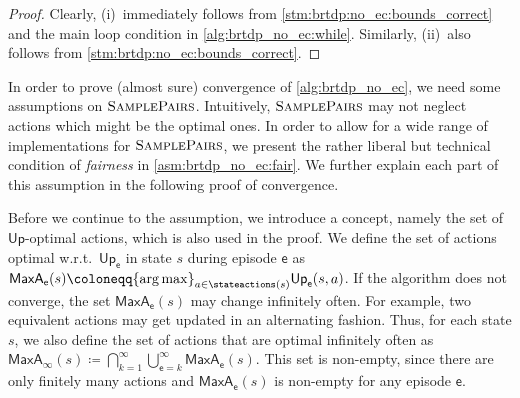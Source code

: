 \documentclass{theoretics}
\newcommand{\UnionSym}{\bigcup}
\newcommand{\IntersectionSym}{\bigcap}
\newcommand{\Union}{\UnionSym}
\newcommand{\Intersection}{\IntersectionSym}
\DeclareMathOperator*{\argmax}{arg\,max}
\newcommand{\upperbound}{\mathsf{Up}}
\newcommand{\samplepath}{\textsc{SamplePairs}}
\newcommand{\algoepisode}{\mathsf{e}}
\newcommand{\umaxactions}{\mathsf{MaxA}}
\begin{document}
\begin{proof}
	Clearly, (i)~immediately follows from \cref{stm:brtdp:no_ec:bounds_correct} and the main loop condition in \cref{alg:brtdp_no_ec:while}.
	Similarly, (ii)~also follows from \cref{stm:brtdp:no_ec:bounds_correct}. 
\end{proof}
In order to prove (almost sure) convergence of \cref{alg:brtdp_no_ec}, we need some assumptions on $\samplepath$.
Intuitively, $\samplepath$ may not neglect actions which might be the optimal ones.
In order to allow for a wide range of implementations for $\samplepath$, we present the rather liberal but technical condition of \emph{fairness} in \cref{asm:brtdp_no_ec:fair}.
We further explain each part of this assumption in the following proof of convergence.

Before we continue to the assumption, we introduce a concept, namely the set of $\upperbound$-optimal actions, which is also used in the proof.
We define the set of actions optimal w.r.t.\ $\upperbound_\algoepisode$ in state $s$ during episode $\algoepisode$ as $\umaxactions_\algoepisode(s) \coloneqq {\argmax}_{a \in \stateactions(s)} \upperbound_\algoepisode(s, a)$.
If the algorithm does not converge, the set $ \umaxactions_{\algoepisode}(s)$ may change infinitely often.
For example, two equivalent actions may get updated in an alternating fashion.
Thus, for each state $s$, we also define the set of actions that are optimal infinitely often as $\umaxactions_\infty(s) \coloneqq {\Intersection}_{k = 1}^\infty {\Union}_{\algoepisode = k}^\infty \umaxactions_{\algoepisode}(s)$.
This set is non-empty, since there are only finitely many actions and $\umaxactions_\algoepisode(s)$ is non-empty for any episode $\algoepisode$.
\end{document}
